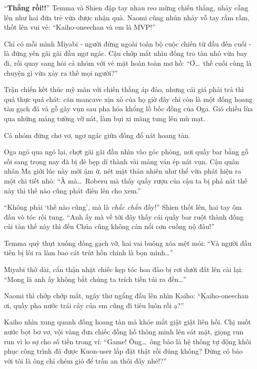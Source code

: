 \documentclass[../main.tex]{subfiles}
\begin{document}
``\textbf{Thắng rồi!!}'' Temma và Shien đập tay nhau reo mừng chiến thắng, nhảy cẫng lên như hai đứa trẻ vừa được nhận quà. Naomi cũng nhún nhảy vỗ tay rầm rầm, thốt lên vui vẻ: ``Kaiho-oneechan và em là MVP!''

Chỉ có mỗi mình Miyabi - người đứng ngoài toàn bộ cuộc chiến từ đầu đến cuối - là đứng yên gãi gãi đầu ngơ ngác. Cậu chớp mắt nhìn đống tro tàn nhỏ vừa bay đi, rồi quay sang hỏi cả nhóm với vẻ mặt hoàn toàn mơ hồ: ``Ơ\dots\ thế cuối cùng là chuyện gì vừa xảy ra thế mọi người?''

Trận chiến kết thúc mỹ mãn với chiến thắng áp đảo, nhưng cái giá phải trả thì quả thực quá chát: căn mancave xịn xò của họ giờ đây chỉ còn là một đống hoang tàn gạch đá và gỗ gãy vụn sau pha hóa khổng lồ bốc đồng của Oga. Gió chiều lùa qua những mảng tường vỡ nát, làm bụi xi măng tung lên mù mạt.

Cả nhóm đứng chơ vơ, ngơ ngác giữa đống đổ nát hoang tàn.

Oga ngó qua ngó lại, chợt gãi gãi đầu nhìn vào góc phòng, nơi quầy bar bằng gỗ sồi sang trọng nay đã bị đè bẹp dí thành vài mảng ván ép nát vụn. Cậu quân nhân Ma giới lúc này mới ậm ừ, nét mặt thản nhiên như thể vừa phát hiện ra một chi tiết nhỏ: ``À mà\dots\ Roberu mà thấy quầy rượu của cậu ta bị phá nát thế này thì thế nào cũng phát điên lên cho xem.''

``Không phải `thế nào cũng', mà là \emph{chắc chắn} đấy!'' Shien thốt lên, hai tay ôm đầu vò tóc rối tung. ``Anh ấy mà về tới đây thấy cái quầy bar ruột thành đống củi tàn thế này thì đến Chúa cũng không cản nổi cơn cuồng nộ đâu!''

Temma quỳ thụt xuống đống gạch vỡ, hai vai buông xõa mệt mỏi: ``Và người đầu tiên bị lôi ra làm bao cát trút hồn chính là bọn mình\dots''

Miyabi thở dài, cẩn thận nhặt chiếc kẹp tóc hoa đào bị rơi dưới đất lên cài lại: ``Mong là anh ấy không bắt chúng ta trích tiền túi ra đền\dots''

Naomi thì chớp chớp mắt, ngây thơ ngẩng đầu lên nhìn Kaiho: ``Kaiho-oneechan ơi, quầy pha nước trái cây của em cũng đi tiêu luôn rồi ạ?''

Kaiho nhìn xung quanh đống hoang tàn mà khóe mắt giật giật liên hồi. Chị nuốt nước bọt bơ vơ, vội vàng đưa chiếc đồng hồ thông minh lên sát mặt, giọng run run vì lo sợ cho số tiền trong ví: ``Game! Ông\dots\ ông bảo là hệ thống tự động khôi phục công trình đã được Kuon-user lắp đặt thật rồi đúng không? Đừng có bảo với tôi là ông chỉ chém gió để trấn an thôi đấy nhé!?''
\end{document}
